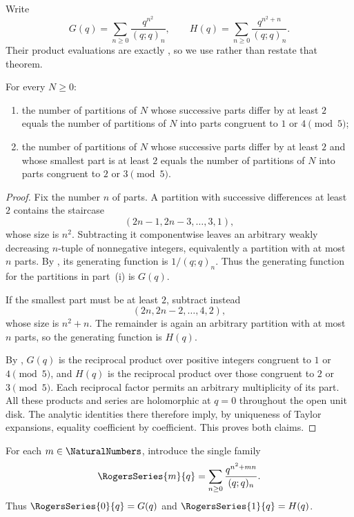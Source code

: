 Write
\[
 G(q)=\sum_{n\ge0}\frac{q^{n^2}}{(q;q)_n},
 \qquad
 H(q)=\sum_{n\ge0}\frac{q^{n^2+n}}{(q;q)_n}.
\]
Their product evaluations are exactly
, so we use rather than restate that theorem.

\begin{corollary}
\label{qg:cor-rr-partitions}
For every \(N\ge0\):
\begin{enumerate}[label=\textup{(\roman*)}]
\item the number of partitions of \(N\) whose successive parts differ by
at least \(2\) equals the number of partitions of \(N\) into parts
congruent to \(1\) or \(4\pmod 5\);
\item the number of partitions of \(N\) whose successive parts differ by
at least \(2\) and whose smallest part is at least \(2\) equals the number
of partitions of \(N\) into parts congruent to \(2\) or \(3\pmod 5\).
\end{enumerate}
\end{corollary}

\begin{proof}
Fix the number \(n\) of parts.  A partition with successive differences at
least \(2\) contains the staircase
\[
  (2n-1,2n-3,\ldots,3,1),
\]
whose size is \(n^2\).  Subtracting it componentwise leaves an arbitrary
weakly decreasing \(n\)-tuple of nonnegative integers, equivalently a
partition with at most \(n\) parts.  By
, its generating function is
\(1/(q;q)_n\).  Thus the generating function for the partitions in
part~\textup{(i)} is \(G(q)\).

If the smallest part must be at least \(2\), subtract instead
\[
  (2n,2n-2,\ldots,4,2),
\]
whose size is \(n^2+n\).  The remainder is again an arbitrary partition
with at most \(n\) parts, so the generating function is \(H(q)\).

By , \(G(q)\) is the reciprocal product over
positive integers congruent to \(1\) or \(4\pmod5\), and \(H(q)\) is
the reciprocal product over those congruent to \(2\) or \(3\pmod5\).
Each reciprocal factor permits an arbitrary multiplicity of its part.
All these products and series are holomorphic at \(q=0\) throughout the
open unit disk.  The analytic identities there therefore imply, by
uniqueness of Taylor expansions, equality coefficient by coefficient.
This proves both claims.
\end{proof}

For each \(m\in\NaturalNumbers\), introduce the single family
\begin{equation}
  \RogersSeries{m}{q}
  =\sum_{n\ge0}\frac{q^{n^2+mn}}{(q;q)_n}.
  \label{qg:eq:rogers-family}
\end{equation}
Thus \(\RogersSeries{0}{q}=G(q)\) and \(\RogersSeries{1}{q}=H(q)\).


